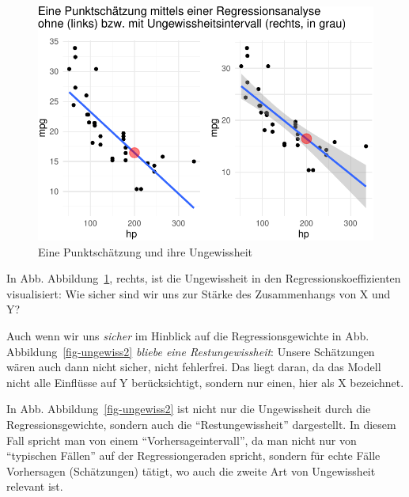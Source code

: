 \documentclass[
  a4paper,
  DIV=11]{scrreprt}
\theoremstyle{definition}
\theoremstyle{remark}
\begin{document}
\begin{figure}

{\centering \includegraphics{./Inferenz_files/figure-pdf/fig-punktschaetzer-1.pdf}

}

\caption{\label{fig-punktschaetzer}Eine Punktschätzung und ihre
Ungewissheit}

\end{figure}

In Abb. Abbildung~\ref{fig-punktschaetzer}, rechts, ist die Ungewissheit
in den Regressionskoeffizienten visualisiert: Wie sicher sind wir uns
zur Stärke des Zusammenhangs von X und Y?

Auch wenn wir uns \emph{sicher} im Hinblick auf die Regressionsgewichte
in Abb. Abbildung~\ref{fig-ungewiss2} \emph{bliebe eine
Restungewissheit}: Unsere Schätzungen wären auch dann nicht sicher,
nicht fehlerfrei. Das liegt daran, da das Modell nicht alle Einflüsse
auf Y berücksichtigt, sondern nur einen, hier als X bezeichnet.

In Abb. Abbildung~\ref{fig-ungewiss2} ist nicht nur die Ungewissheit
durch die Regressionsgewichte, sondern auch die ``Restungewissheit''
dargestellt. In diesem Fall spricht man von einem
``Vorhersageintervall'', da man nicht nur von ``typischen Fällen'' auf
der Regressiongeraden spricht, sondern für echte Fälle Vorhersagen
(Schätzungen) tätigt, wo auch die zweite Art von Ungewissheit relevant
ist.
\end{document}
